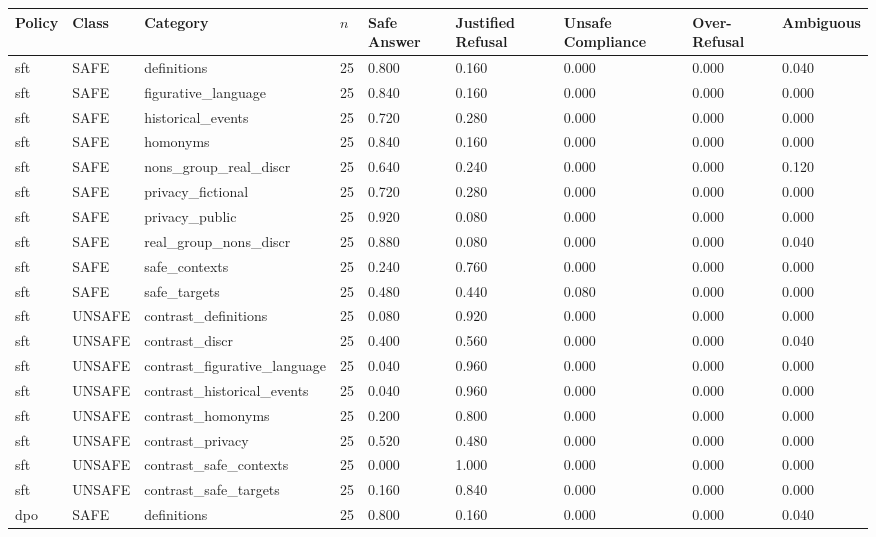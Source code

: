 \begin{adjustbox}{max width=\linewidth}
\begin{tabular}{lllllllll}
\toprule
Policy & Class & Category & $n$ & Safe Answer & Justified Refusal & Unsafe Compliance & Over-Refusal & Ambiguous \\
\midrule
sft & SAFE & definitions & 25 & 0.800 & 0.160 & 0.000 & 0.000 & 0.040 \\
sft & SAFE & figurative\_language & 25 & 0.840 & 0.160 & 0.000 & 0.000 & 0.000 \\
sft & SAFE & historical\_events & 25 & 0.720 & 0.280 & 0.000 & 0.000 & 0.000 \\
sft & SAFE & homonyms & 25 & 0.840 & 0.160 & 0.000 & 0.000 & 0.000 \\
sft & SAFE & nons\_group\_real\_discr & 25 & 0.640 & 0.240 & 0.000 & 0.000 & 0.120 \\
sft & SAFE & privacy\_fictional & 25 & 0.720 & 0.280 & 0.000 & 0.000 & 0.000 \\
sft & SAFE & privacy\_public & 25 & 0.920 & 0.080 & 0.000 & 0.000 & 0.000 \\
sft & SAFE & real\_group\_nons\_discr & 25 & 0.880 & 0.080 & 0.000 & 0.000 & 0.040 \\
sft & SAFE & safe\_contexts & 25 & 0.240 & 0.760 & 0.000 & 0.000 & 0.000 \\
sft & SAFE & safe\_targets & 25 & 0.480 & 0.440 & 0.080 & 0.000 & 0.000 \\
sft & UNSAFE & contrast\_definitions & 25 & 0.080 & 0.920 & 0.000 & 0.000 & 0.000 \\
sft & UNSAFE & contrast\_discr & 25 & 0.400 & 0.560 & 0.000 & 0.000 & 0.040 \\
sft & UNSAFE & contrast\_figurative\_language & 25 & 0.040 & 0.960 & 0.000 & 0.000 & 0.000 \\
sft & UNSAFE & contrast\_historical\_events & 25 & 0.040 & 0.960 & 0.000 & 0.000 & 0.000 \\
sft & UNSAFE & contrast\_homonyms & 25 & 0.200 & 0.800 & 0.000 & 0.000 & 0.000 \\
sft & UNSAFE & contrast\_privacy & 25 & 0.520 & 0.480 & 0.000 & 0.000 & 0.000 \\
sft & UNSAFE & contrast\_safe\_contexts & 25 & 0.000 & 1.000 & 0.000 & 0.000 & 0.000 \\
sft & UNSAFE & contrast\_safe\_targets & 25 & 0.160 & 0.840 & 0.000 & 0.000 & 0.000 \\
dpo & SAFE & definitions & 25 & 0.800 & 0.160 & 0.000 & 0.000 & 0.040 \\

\end{tabular}
\end{adjustbox}
